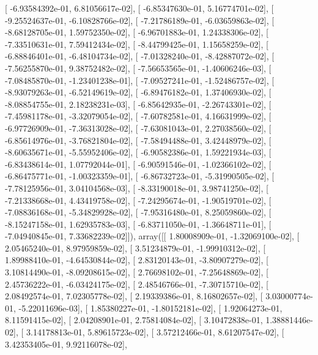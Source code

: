 \documentclass{article}
\begin{document}
       [ -6.93584392e-01,   6.81056617e-02],
       [ -6.85347630e-01,   5.16774701e-02],
       [ -9.25524637e-01,  -6.10828766e-02],
       [ -7.21786189e-01,  -6.03659863e-02],
       [ -8.68128705e-01,   1.59752350e-02],
       [ -6.96701883e-01,   1.24338306e-02],
       [ -7.33510631e-01,   7.59412434e-02],
       [ -8.44799425e-01,   1.15658259e-02],
       [ -6.88846401e-01,  -6.48104734e-02],
       [ -7.01328240e-01,  -8.42887072e-02],
       [ -7.56255870e-01,   9.38752482e-02],
       [ -7.56653565e-01,  -1.40606246e-03],
       [ -7.08485870e-01,  -1.23401238e-01],
       [ -7.09527241e-01,  -1.52486757e-02],
       [ -8.93079263e-01,  -6.52149619e-02],
       [ -6.89476182e-01,   1.37406930e-02],
       [ -8.08854755e-01,   2.18238231e-03],
       [ -6.85642935e-01,  -2.26743301e-02],
       [ -7.45981178e-01,  -3.32079054e-02],
       [ -7.60782581e-01,   4.16631999e-02],
       [ -6.97726909e-01,  -7.36313028e-02],
       [ -7.63081043e-01,   2.27038560e-02],
       [ -6.85614976e-01,  -3.76821804e-02],
       [ -7.58494488e-01,   3.42448979e-02],
       [ -8.60635671e-01,  -5.55952406e-02],
       [ -6.90582386e-01,   1.59221934e-03],
       [ -6.83438614e-01,   1.07792044e-01],
       [ -6.90591546e-01,  -1.02366102e-02],
       [ -6.86475771e-01,  -1.00323359e-01],
       [ -6.86732723e-01,  -5.31990505e-02],
       [ -7.78125956e-01,   3.04104568e-03],
       [ -8.33190018e-01,   3.98741250e-02],
       [ -7.21338668e-01,   4.43419758e-02],
       [ -7.24295674e-01,  -1.90519701e-02],
       [ -7.08836168e-01,  -5.34829928e-02],
       [ -7.95316480e-01,   8.25059860e-02],
       [ -8.15247158e-01,   1.62935783e-03],
       [ -6.83711050e-01,  -1.36648711e-01],
       [ -7.04940845e-01,   7.33682239e-02]]), array([[  1.80008909e-01,  -1.32069100e-02],
       [  2.05465240e-01,   8.97959859e-02],
       [  3.51234879e-01,  -1.99910312e-02],
       [  1.89988410e-01,  -4.64530844e-02],
       [  2.83120143e-01,  -3.80907279e-02],
       [  3.10814490e-01,  -8.09208615e-02],
       [  2.76698102e-01,  -7.25648869e-02],
       [  2.45736222e-01,  -6.03424175e-02],
       [  2.48546766e-01,  -7.30715710e-02],
       [  2.08492574e-01,   7.02305778e-02],
       [  2.19339386e-01,   8.16802657e-02],
       [  3.03000774e-01,  -5.22011696e-03],
       [  1.85380227e-01,  -1.80152181e-02],
       [  1.92064273e-01,   8.11591415e-02],
       [  2.04208901e-01,   2.75814084e-02],
       [  3.10472838e-01,   1.38881446e-02],
       [  3.14178813e-01,   5.89615723e-02],
       [  3.57212466e-01,   8.61207547e-02],
       [  3.42353405e-01,   9.92116078e-02],
\end{document}
